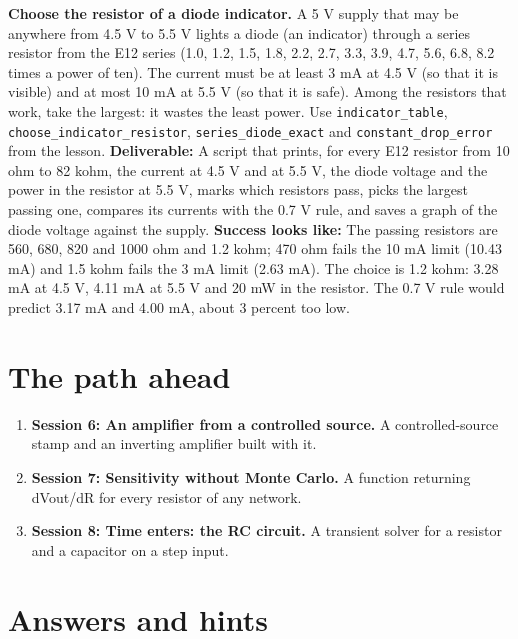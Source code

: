\documentclass[11pt,a4paper]{article}
\begin{document}
\textbf{Choose the resistor of a diode indicator.} A 5 V supply that may be anywhere from 4.5 V to 5.5 V lights a diode (an indicator) through a series resistor from the E12 series (1.0, 1.2, 1.5, 1.8, 2.2, 2.7, 3.3, 3.9, 4.7, 5.6, 6.8, 8.2 times a power of ten). The current must be at least 3 mA at 4.5 V (so that it is visible) and at most 10 mA at 5.5 V (so that it is safe). Among the resistors that work, take the largest: it wastes the least power. Use \texttt{indicator\_table}, \texttt{choose\_indicator\_resistor}, \texttt{series\_diode\_exact} and \texttt{constant\_drop\_error} from the lesson. \textbf{Deliverable:} A script that prints, for every E12 resistor from 10 ohm to 82 kohm, the current at 4.5 V and at 5.5 V, the diode voltage and the power in the resistor at 5.5 V, marks which resistors pass, picks the largest passing one, compares its currents with the 0.7 V rule, and saves a graph of the diode voltage against the supply. \textbf{Success looks like:} The passing resistors are 560, 680, 820 and 1000 ohm and 1.2 kohm; 470 ohm fails the 10 mA limit (10.43 mA) and 1.5 kohm fails the 3 mA limit (2.63 mA). The choice is 1.2 kohm: 3.28 mA at 4.5 V, 4.11 mA at 5.5 V and 20 mW in the resistor. The 0.7 V rule would predict 3.17 mA and 4.00 mA, about 3 percent too low.

\section{The path ahead}
\begin{enumerate}[nosep]
\item \textbf{Session 6: An amplifier from a controlled source.} A controlled-source stamp and an inverting amplifier built with it.
\item \textbf{Session 7: Sensitivity without Monte Carlo.} A function returning dVout/dR for every resistor of any network.
\item \textbf{Session 8: Time enters: the RC circuit.} A transient solver for a resistor and a capacitor on a step input.
\end{enumerate}

\section{Answers and hints}
\end{document}
